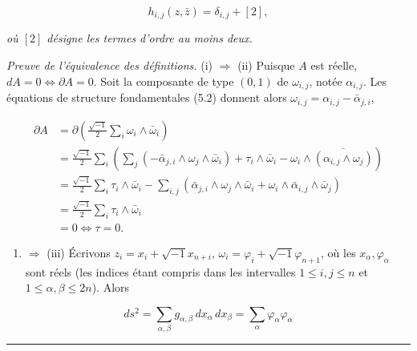 \documentclass[
  french,
  a3paper,
  a3paper]{extarticle}
\providecommand{\tightlist}{%
  \setlength{\itemsep}{0pt}\setlength{\parskip}{0pt}}
\begin{document}
\[\tag{5.3}h_{i,j}(z,\bar z)=\delta_{i,j}+[2],\]

\emph{où \([2]\) désigne les termes d'ordre au moins deux.}

\emph{Preuve de l'équivalence des définitions.} (i) \(\Rightarrow\) (ii)
Puisque \(A\) est réelle, \(dA=0\Longleftrightarrow\partial A=0\). Soit
la composante de type \((0,1)\) de \(\omega_{i,j}\), notée
\(\alpha_{i,j}\). Les équations de structure fondamentales (5.2) donnent
alors \(\omega_{i,j}=\alpha_{i,j}-\bar\alpha_{j,i}\),

\[\begin{aligned}\partial A&=\partial\left(\frac{\sqrt{-1}}2\sum_i\omega_i\wedge\bar\omega_i\right)\\&=\frac{\sqrt{-1}}2\sum_i\left(\sum_j(-\bar\alpha_{j,i}\wedge\omega_j\wedge\bar\omega_i)+\tau_i\wedge\bar\omega_i-\omega_i\wedge\overline{(\alpha_{i,j}\wedge\omega_j)}\right)\\&=\frac{\sqrt{-1}}2\sum_i\tau_i\wedge\bar\omega_i-\sum_{i,j}(\bar\alpha_{j,i}\wedge\omega_j\wedge\bar\omega_i+\omega_i\wedge\bar\alpha_{i,j}\wedge\bar\omega_j)\\&=\frac{\sqrt{-1}}2\sum_i\tau_i\wedge\bar\omega_i\\&=0\Longleftrightarrow\tau=0.\end{aligned}\]

\begin{enumerate}
\def\labelenumi{(\roman{enumi})}
\setcounter{enumi}{1}
\tightlist
\item
  \(\Rightarrow\) (iii) Écrivons \(z_i=x_i+\sqrt{-1}x_{n+i}\),
  \(\omega_i=\varphi_i+\sqrt{-1}\varphi_{n+1}\), où les
  \(x_\alpha,\varphi_\alpha\) sont réels (les indices étant compris dans
  les intervalles \(1\le i,j\le n\) et \(1\le\alpha,\beta\le2n\)). Alors
\end{enumerate}

\[ds^2=\sum_{\alpha,\beta}g_{\alpha,\beta}\,dx_\alpha\,dx_\beta=\sum_\alpha\varphi_\alpha\varphi_\alpha\]

\clearpage



\par

\vspace{0.7mm}\hrule\vspace{1.6mm}

\fontsize{9}{11}\selectfont
\end{document}
